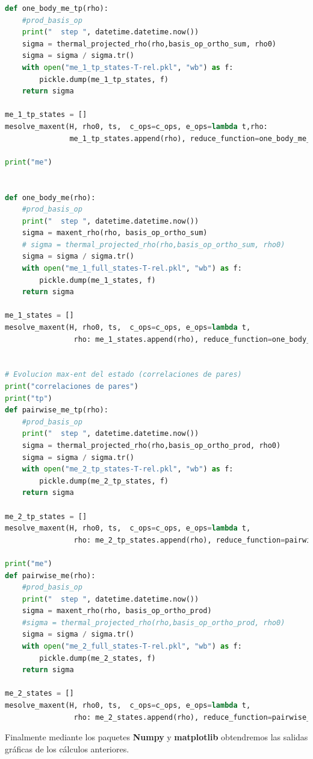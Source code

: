 \documentclass{report} %
\numberwithin{equation}{section}
\begin{document}
\begin{lstlisting}[language=Python]
def one_body_me_tp(rho):
    #prod_basis_op
    print("  step ", datetime.datetime.now())
    sigma = thermal_projected_rho(rho,basis_op_ortho_sum, rho0)
    sigma = sigma / sigma.tr()
    with open("me_1_tp_states-T-rel.pkl", "wb") as f:
        pickle.dump(me_1_tp_states, f)
    return sigma

me_1_tp_states = []
mesolve_maxent(H, rho0, ts,  c_ops=c_ops, e_ops=lambda t,rho:
               me_1_tp_states.append(rho), reduce_function=one_body_me_tp)

print("me")


def one_body_me(rho):
    #prod_basis_op
    print("  step ", datetime.datetime.now())
    sigma = maxent_rho(rho, basis_op_ortho_sum)
    # sigma = thermal_projected_rho(rho,basis_op_ortho_sum, rho0)
    sigma = sigma / sigma.tr()
    with open("me_1_full_states-T-rel.pkl", "wb") as f:
        pickle.dump(me_1_states, f)
    return sigma

me_1_states = []
mesolve_maxent(H, rho0, ts,  c_ops=c_ops, e_ops=lambda t,
                rho: me_1_states.append(rho), reduce_function=one_body_me)


# Evolucion max-ent del estado (correlaciones de pares)
print("correlaciones de pares")
print("tp")
def pairwise_me_tp(rho):
    #prod_basis_op
    print("  step ", datetime.datetime.now())
    sigma = thermal_projected_rho(rho,basis_op_ortho_prod, rho0)
    sigma = sigma / sigma.tr()
    with open("me_2_tp_states-T-rel.pkl", "wb") as f:
        pickle.dump(me_2_tp_states, f)
    return sigma

me_2_tp_states = []
mesolve_maxent(H, rho0, ts,  c_ops=c_ops, e_ops=lambda t,
                rho: me_2_tp_states.append(rho), reduce_function=pairwise_me_tp)

print("me")
def pairwise_me(rho):
    #prod_basis_op
    print("  step ", datetime.datetime.now())
    sigma = maxent_rho(rho, basis_op_ortho_prod)
    #sigma = thermal_projected_rho(rho,basis_op_ortho_prod, rho0)
    sigma = sigma / sigma.tr()
    with open("me_2_full_states-T-rel.pkl", "wb") as f:
        pickle.dump(me_2_states, f)
    return sigma

me_2_states = []
mesolve_maxent(H, rho0, ts,  c_ops=c_ops, e_ops=lambda t,
                rho: me_2_states.append(rho), reduce_function=pairwise_me)
\end{lstlisting}

Finalmente mediante los paquetes \textbf{Numpy} y \textbf{matplotlib} obtendremos las salidas gráficas de los cálculos anteriores. 
\end{document}
